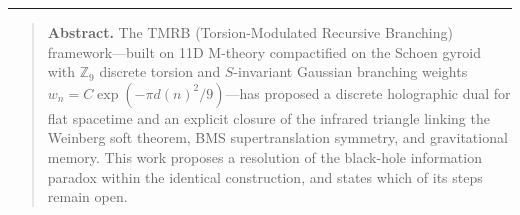\documentclass[11pt,a4paper]{article}
\renewenvironment{abstract}{%
  \begin{quote}\small\textbf{Abstract.}\quad\ignorespaces}%
  {\end{quote}}
\begin{document}
\vspace{2pt}
\begin{center}
{\color{gold}\rule{0.38\textwidth}{0.4pt}}
\end{center}
\vspace{6pt}

\begin{abstract}
The TMRB (Torsion-Modulated Recursive Branching) framework—built on 11D
M-theory compactified on the Schoen gyroid with $\mathbb{Z}_9$ discrete
torsion and $S$-invariant Gaussian branching weights
$w_n = C\exp(-\pi d(n)^2/9)$—has proposed a discrete holographic dual
for flat spacetime and an explicit closure of the infrared triangle linking the
Weinberg soft theorem, BMS supertranslation symmetry, and gravitational memory.
This work proposes a resolution of the black-hole information paradox within
the identical construction, and states which of its steps remain open.


\end{abstract}
\end{document}
